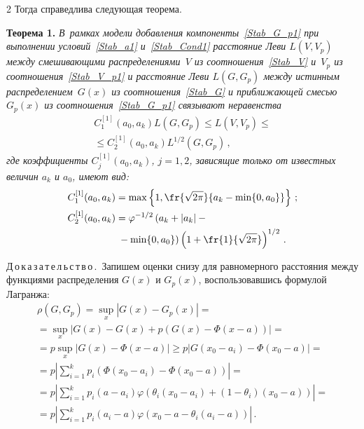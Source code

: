 \begin{multicols}{2}
Тогда справедлива следующая теорема.

\medskip

\noindent
\textbf{Теорема 1.}
\textit{В~рамках модели добавления компоненты~\eqref{Stab_G_p1} при
выполнении условий~\eqref{Stab_a1} и~\eqref{Stab_Cond1} расстояние
Леви $L(V,V_p)$ между смешивающими распределениями~$V$ из
соотношения~\eqref{Stab_V} и~$V_p$ из соотношения~\eqref{Stab_V_p1}
и расстояние Леви $L(G,G_p)$ между истинным распределением~$G(x)$
из соотношения~\eqref{Stab_G} и приближающей смесью $G_p(x)$ из
соотношения~\eqref{Stab_G_p1} связывают неравенства}
\begin{multline*}
C_1^{[1]}(a_0,a_k)L(G,G_p)\leqslant L(V,V_p)\leqslant{}\\
{}\leqslant
C_2^{[1]}(a_0,a_k)L^{1/2}(G,G_p)\,, 
\end{multline*}
\textit{где коэффициенты $C_j^{[1]}(a_0,a_k)$, $j=1,2$, зависящие
только от известных величин $a_k$ и $a_0$, имеют вид:}
\begin{align}
C_1^{[1]}(a_0,a_k)&=\max
\left\{1,\fr{\sqrt{2\pi}}{a_k-\min\{0,a_0\}}\right\}\,;
\label{Stab_C11}\\
C_2^{[1]}(a_0,a_k)&=\varphi^{-1/2}\left(a_k+|a_k|-{}\right.\notag\\
&\left.{}-\min\{0,a_0\}\right)
\left(1+\fr{1}{\sqrt{2\pi}}\right)^{1/2}\,.
\label{Stab_C12}
\end{align}


\medskip

\noindent
Д\,о\,к\,а\,з\,а\,т\,е\,л\,ь\,с\,т\,в\,о\,.\ 
Запишем оценки снизу для равномерного расстояния между функциями
распределения $G(x)$ и $G_p(x)$, воспользовавшись формулой
Лагранжа:
\begin{multline}
\rho(G,G_p)=\sup\limits_x|G(x)-G_p(x)|={}\\
{}=\sup\limits_x|G(x)-
G(x)+p(G(x)-\Phi(x-a))|={}\\
{}=p\sup\limits_x|G(x)-\Phi(x-a)|\geqslant
p|G(x_0-a_i)-\Phi(x_0-a)|={}\\
{}=p\left|\sum\limits_{i=1}^k
p_i\left(\Phi(x_0-a_i)-\Phi(x_0-a)\right)\right|={}\\
\!\!{}=\!p\left|\sum\limits_{i=1}^k
p_i(a-a_i)\varphi(\theta_i(x_0-a_i)\!+\!(1-\theta_i)(x_0-a))\right|\!={}\\
{}=p\left|\sum\limits_{i=1}^k p_i(a_i-a)\varphi(x_0-a-\theta_i(a_i-a))\right|\,.
\label{rho}
\end{multline}


\end{multicols}
